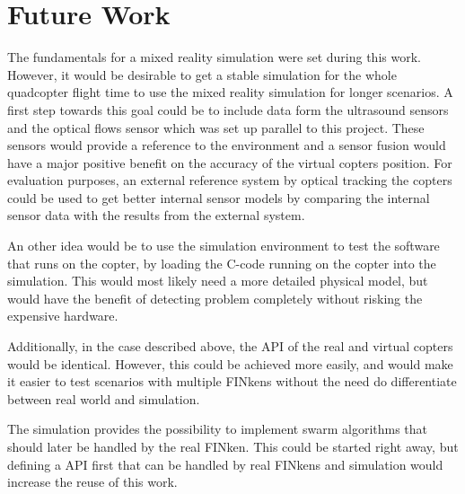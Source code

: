 \section{Future Work}
\label{future}
The fundamentals for a mixed reality simulation were set during this work.
However, it would be desirable to get a stable simulation for the whole quadcopter flight time to use the mixed reality simulation for longer scenarios.
A first step towards this goal could be to include data form the ultrasound sensors and the optical flows sensor which was set up parallel to this project.
These sensors would provide a reference to the environment and a sensor fusion would have a major positive benefit on the accuracy of the virtual copters position.
For evaluation purposes, an external reference system by optical tracking the copters could be used to get better internal sensor models by comparing the internal sensor data with the results from the external system.

An other idea would be to use the simulation environment to test the software that runs on the copter, by loading the C-code running on the copter into the simulation.
This would most likely need a more detailed physical model, but would have the benefit of detecting problem completely without risking the expensive hardware.

Additionally, in the case described above, the API of the real and virtual copters would be identical. 
However, this could be achieved more easily, and would make it easier to test scenarios with multiple FINkens without the need do differentiate between real world and simulation.


The simulation  provides the possibility to implement swarm algorithms that should later be handled by the real FINken.
This could be started right away, but defining a API first that can be handled by real FINkens and simulation would increase the reuse of this work.







